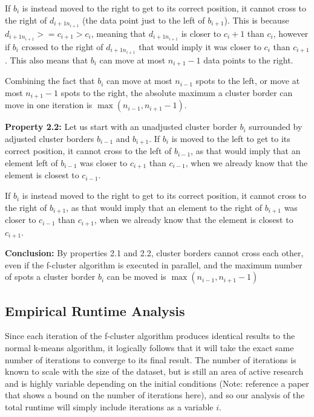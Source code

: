 \documentclass[conference,compsoc]{IEEEtran}
\begin{document}
If $b_i$ is instead moved to the right to get to its correct position, it cannot cross to the right of $d_{i+1n_{i+1}}$ (the data point just to the left of $b_{i+1}$).
This is because $d_{i+1n_{i+1}} >= c_{i+1} > c_i$, meaning that $d_{i+1n_{i+1}}$ is closer to $c_i+1$ than $c_i$,
however if $b_i$ crossed to the right of $d_{i+1n_{i+1}}$ that would imply it was closer to $c_i$ than $c_{i+1}$.
This also means that $b_i$ can move at most $n_{i+1}-1$ data points to the right.

Combining the fact that $b_i$ can move at most $n_{i-1}$ spots to the left, or move at most $n_{i+1}-1$ spots to the right, the absolute maximum a cluster border can move in one iteration is $\max(n_{i-1}, n_{i+1}-1)$.

\textbf{Property 2.2:}
Let us start with an unadjusted cluster border $b_i$ surrounded by adjusted cluster borders $b_{i-1}$ and $b_{i+1}$.
If $b_i$ is moved to the left to get to its correct position, it cannot cross to the left of $b_{i-1}$,
as that would imply that an element left of $b_{i-1}$ was closer to $c_{i+1}$ than $c_{i-1}$, when we already know that the element is closest to $c_{i-1}$.

If $b_i$ is instead moved to the right to get to its correct position, it cannot cross to the right of $b_{i+1}$,
as that would imply that an element to the right of $b_{i+1}$ was closer to $c_{i-1}$ than $c_{i+1}$, when we already know that the element is closest to $c_{i+1}$.

\textbf{Conclusion:}
By properties 2.1 and 2.2, cluster borders cannot cross each other, even if the f-cluster algorithm is executed in parallel, and the maximum number of spots a cluster border $b_i$ can be moved is $\max(n_{i-1}, n_{i+1}-1)$

\subsection{Empirical Runtime Analysis}
Since each iteration of the f-cluster algorithm produces identical results to the normal k-means algorithm,
it logically follows that it will take the exact same number of iterations to converge to its final result.
The number of iterations is known to scale with the size of the dataset,
 but is still an area of active research and is highly variable depending on the initial conditions
 (Note: reference a paper that shows a bound on the number of iterations here),
 and so our analysis of the total runtime will simply include iterations as a variable $i$. 
 \par
\end{document}
